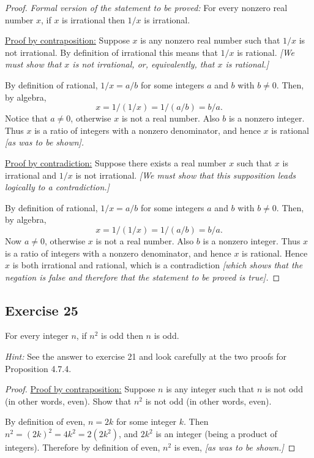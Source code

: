 \documentclass[14pt]{extarticle}
\begin{document}
\begin{proof}
{\it Formal version of the statement to be proved:} For every nonzero real number $x$, if $x$ is irrational then $1/x$ is irrational.

\underline{Proof by contraposition:} Suppose $x$ is any nonzero real number such that $1/x$ is not irrational. By definition of irrational this means that $1/x$ is rational. {\it [We must show that $x$ is not irrational, or, equivalently, that $x$ is rational.]} 

By definition of rational, $1/x = a/b$ for some integers $a$ and $b$ with $b \neq 0$. Then, by algebra,
\[
x = 1/(1/x) = 1/(a/b) = b/a.
\]
Notice that $a \neq 0$, otherwise $x$ is not a real number. Also $b$ is a nonzero integer. Thus $x$ is a ratio of integers with a nonzero denominator, and hence $x$ is rational {\it [as was to be shown].}

\underline{Proof by contradiction:} Suppose there exists a real number $x$ such that $x$ is irrational and $1/x$ is not irrational. {\it [We must show that this supposition leads logically to a contradiction.]} 

By definition of rational, $1/x = a/b$ for some integers $a$ and $b$ with $b \neq 0$. Then, by algebra,
\[
x = 1/(1/x) = 1/(a/b) = b/a.
\]
Now $a \neq 0$, otherwise $x$ is not a real number. Also $b$ is a nonzero integer. Thus $x$ is a ratio of integers with a nonzero denominator, and hence $x$ is rational. Hence $x$ is both irrational and rational, which is a contradiction {\it [which shows that the negation is false and therefore that the statement to be proved is true].}
\end{proof}

\subsection{Exercise 25}
For every integer $n$, if $n^2$ is odd then $n$ is odd.

{\it Hint:} See the answer to exercise 21 and look carefully at the two proofs for Proposition 4.7.4.

\begin{proof}
\underline{Proof by contraposition:} Suppose $n$ is any integer such that $n$ is not odd (in other words, even). Show that $n^2$ is not odd (in other words, even).

By definition of even, $n = 2k$ for some integer $k$. Then $n^2 = (2k)^2 = 4k^2 = 2(2k^2)$, and $2k^2$ is an integer (being a product of integers). Therefore by definition of even, $n^2$ is even, {\it [as was to be shown.]}
\end{proof}
\end{document}
